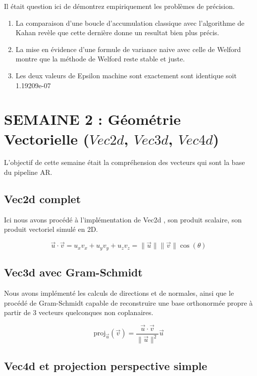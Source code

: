 \documentclass[12pt,a4paper]{report}
\begin{document}
Il était question ici de démontrez empiriquement les problèmes de précision.

\begin{enumerate}
    \item La comparaison d'une boucle d'accumulation classique avec l'algorithme de Kahan revèle que cette dernière donne un resultat bien plus précis.
    \item La mise en évidence d'une formule de variance naive avec celle de Welford montre que la méthode de Welford reste stable et juste.
    \item Les deux valeurs de Epsilon machine sont exactement sont identique soit 1.19209e-07 
\end{enumerate}

\chapter{SEMAINE 2 : Géométrie Vectorielle ($Vec2d$, $Vec3d$, $Vec4d$)}

L'objectif de cette semaine était la compréhension des vecteurs qui sont la base du pipeline AR.

\section{Vec2d complet}

Ici nous avons procédé à l'implémentation de Vec2d , son produit scalaire, son produit vectoriel simulé en 2D.

 $$\vec{u} \cdot \vec{v} = u_x v_x + u_y v_y + u_z v_z = \|\vec{u}\| \|\vec{v}\| \cos(\theta)$$

\section{Vec3d avec Gram-Schmidt}

Nous avons implémenté les calculs de directions et de normales, ainsi que le procédé de Gram-Schmidt capable de reconstruire une base orthonormée propre à partir de 3 vecteurs quelconques non coplanaires.

 $$\text{proj}_{\vec{u}}(\vec{v}) = \frac{\vec{u} \cdot \vec{v}}{\|\vec{u}\|^2} \vec{u}$$


\section{Vec4d et projection perspective simple}
\end{document}
